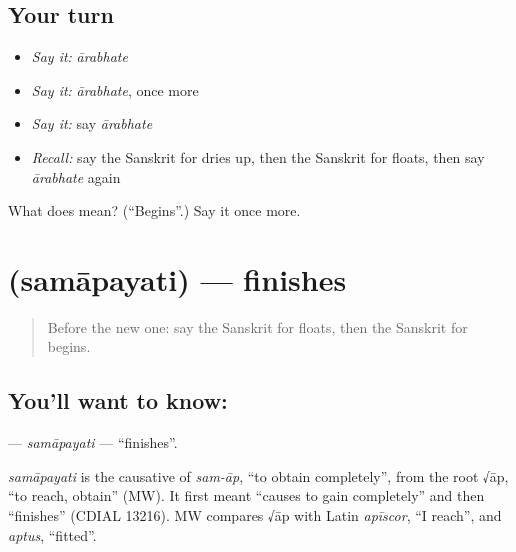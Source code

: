 \subsection*{Your turn}
\begin{itemize}
\raggedright
  \item \emph{Say it:} \emph{ārabhate}
  \item \emph{Say it:} \emph{ārabhate}, once more
  \item \emph{Say it:} say \emph{ārabhate}
  \item \emph{Recall:} say the Sanskrit for dries up, then the Sanskrit for floats, then say \emph{ārabhate} again
\end{itemize}

\begin{tcolorbox}[breakable,colback=teal!4,colframe=teal!35!black,title={Before you move on}]
What does  mean? (\textquotedblleft{}Begins\textquotedblright{}.) Say it once more.
\end{tcolorbox}
\section[\texorpdfstring{\sk{समापयति} (samāpayati)}{समापयति (samāpayati)}]{ (samāpayati) — finishes}

\label{lesson:SA-C234-samapayati}



\begin{quote}
Before the new one: say the Sanskrit for floats, then the Sanskrit for begins.
\end{quote}

\subsection*{You'll want to know: }
\textbf{} — \emph{samāpayati} — \textquotedblleft{}finishes\textquotedblright{}.

\begin{cousinweb}
\emph{samāpayati} is the causative of \emph{sam-āp}, \textquotedblleft{}to obtain completely\textquotedblright{}, from the root √āp, \textquotedblleft{}to reach, obtain\textquotedblright{} (MW). It first meant \textquotedblleft{}causes to gain completely\textquotedblright{} and then \textquotedblleft{}finishes\textquotedblright{} (CDIAL 13216). MW compares √āp with Latin \emph{apīscor}, \textquotedblleft{}I reach\textquotedblright{}, and \emph{aptus}, \textquotedblleft{}fitted\textquotedblright{}.
\end{cousinweb}

